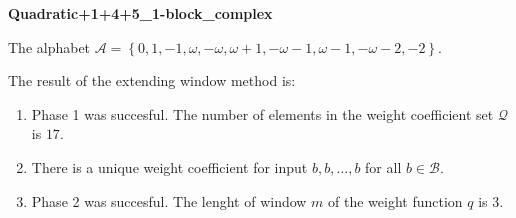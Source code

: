 \begin{exmp}
\textbf{ Quadratic+1+4+5\_1-block\_complex }

\label{ex:Quadratic+1+4+51-blockcomplex}

The alphabet $\mathcal{A} =\left\{0, 1, -1, \omega, -\omega, \omega + 1, -\omega - 1, \omega - 1, -\omega - 2, -2\right\}$.

The result of the extending window method is:
\begin{enumerate}
    \item Phase 1 was succesful.
The number of elements in the weight coefficient set $\mathcal{Q}$ is $17$.

    \item There is a unique weight coefficient for input $b,b,\dots,b$ for all $b\in\mathcal{B}$.

    \item Phase 2 was succesful.
The lenght of window $m$ of the weight function $q$ is 3.
\end{enumerate}
\end{exmp}
